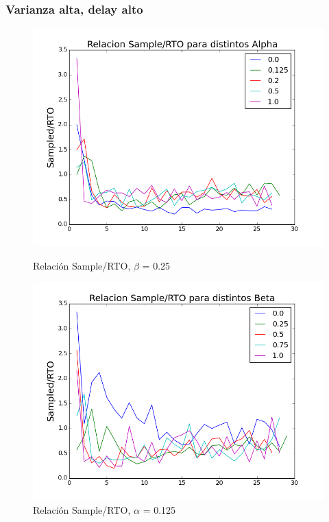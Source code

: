 \subsubsection{Varianza alta, delay alto}

\begin{figure}[H]
\begin{minipage}{0.5\linewidth}
\includegraphics[width=\linewidth]{../graficos/alphad025var5drop25.png}
\caption{Relación Sample/RTO, $\beta$ = 0.25}\label{fig:alpha-var5-drop25-alto}
\end{minipage}
\hfill
\begin{minipage}{0.5\linewidth}
\includegraphics[width=\linewidth]{../graficos/betad025var5drop25.png}
\caption{Relación Sample/RTO, $\alpha$ = 0.125}\label{fig:beta-var5-drop25-alto}
\end{minipage}
\end{figure}


